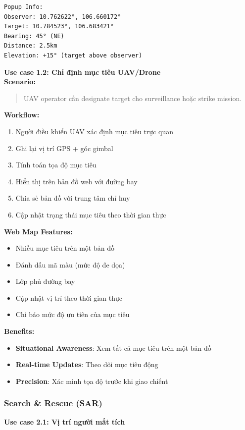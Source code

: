 \begin{itemize}
\begin{verbatim}
Popup Info:
Observer: 10.762622°, 106.660172°
Target: 10.784523°, 106.683421°
Bearing: 45° (NE)
Distance: 2.5km
Elevation: +15° (target above observer)
\end{verbatim}
\textbf{Use case 1.2: Chỉ định mục tiêu UAV/Drone} \\

\textbf{Scenario:}
\begin{quote}
UAV operator cần designate target cho surveillance hoặc strike mission.
\end{quote}

\textbf{Workflow:}
\begin{enumerate}
    \item Người điều khiển UAV xác định mục tiêu trực quan
    \item Ghi lại vị trí GPS + góc gimbal
    \item Tính toán tọa độ mục tiêu
    \item Hiển thị trên bản đồ web với đường bay
    \item Chia sẻ bản đồ với trung tâm chỉ huy
    \item Cập nhật trạng thái mục tiêu theo thời gian thực
\end{enumerate}
\textbf{Web Map Features:}
\begin{itemize}[label=\textbullet]
    \item Nhiều mục tiêu trên một bản đồ
    \item Đánh dấu mã màu (mức độ đe dọa)
    \item Lớp phủ đường bay
    \item Cập nhật vị trí theo thời gian thực
    \item Chỉ báo mức độ ưu tiên của mục tiêu
\end{itemize}
\textbf{Benefits:}
\begin{itemize}[label=\textbullet]
    \item \textbf{Situational Awareness}: Xem tất cả mục tiêu trên một bản đồ
    \item \textbf{Real-time Updates}: Theo dõi mục tiêu động
    \item \textbf{Precision}: Xác minh tọa độ trước khi giao chiếnt
\end{itemize}
\subsubsection{Search \& Rescue (SAR)}
\textbf{Use case 2.1: Vị trí người mất tích} \\


\end{itemize}
